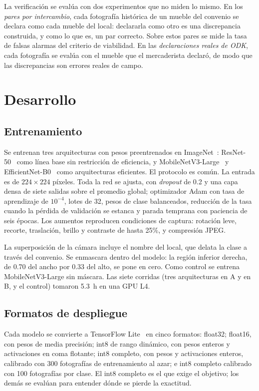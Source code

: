 \documentclass[conference]{IEEEtran}
\begin{document}
La verificación se evalúa con dos experimentos que no miden lo mismo. En los \emph{pares por intercambio}, cada
fotografía histórica de un mueble del convenio se declara como cada mueble del local: declararla como otro es una
discrepancia construida, y como lo que es, un par correcto. Sobre estos pares se mide la tasa de falsas alarmas
del criterio de viabilidad. En las \emph{declaraciones reales de ODK}, cada fotografía se evalúa con el mueble que
el mercaderista declaró, de modo que las discrepancias son errores reales de campo.

\section{Desarrollo}

\subsection{Entrenamiento}

Se entrenan tres arquitecturas con pesos preentrenados en ImageNet~\cite{deng2009}: ResNet-50~\cite{he2016} como
línea base sin restricción de eficiencia, y MobileNetV3-Large~\cite{howard2019} y
EfficientNet-B0~\cite{tan2019} como arquitecturas eficientes. El protocolo es común. La entrada es de
$224 \times 224$ píxeles. Toda la red se ajusta, con \emph{dropout} de 0.2 y una capa densa de siete salidas
sobre el promedio global; optimizador Adam con tasa de aprendizaje de $10^{-4}$, lotes de 32, pesos de clase
balanceados, reducción de la tasa cuando la pérdida de validación se estanca y parada temprana con paciencia de
seis épocas. Los aumentos reproducen condiciones de captura: rotación leve, recorte, traslación, brillo y
contraste de hasta 25\%, y compresión JPEG.

La superposición de la cámara incluye el nombre del local, que delata la clase a través del convenio. Se
enmascara dentro del modelo: la región inferior derecha, de 0.70 del ancho por 0.33 del alto, se pone en cero. Como
control se entrena MobileNetV3-Large sin máscara. Las siete corridas (tres arquitecturas en A y en B, y el control)
tomaron 5.3~h en una GPU L4.

\subsection{Formatos de despliegue}

Cada modelo se convierte a TensorFlow Lite~\cite{tflite2022} en cinco formatos: float32; float16, con pesos de
media precisión; int8 de rango dinámico, con pesos enteros y activaciones en coma flotante; int8 completo, con
pesos y activaciones enteros, calibrado con 300 fotografías de entrenamiento al azar; e int8 completo calibrado con
100 fotografías por clase. El int8 completo es el que exige el objetivo; los demás se evalúan para entender dónde
se pierde la exactitud.
\end{document}
